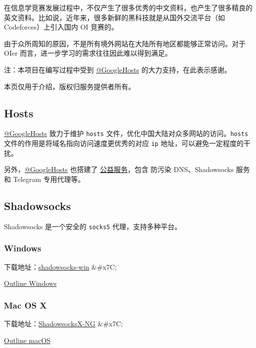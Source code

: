 
在信息学竞赛发展过程中，不仅产生了很多优秀的中文资料，也产生了很多精良的英文资料。比如说，近年来，很多新鲜的黑科技就是从国外交流平台（如 Codeforces）上引入国内 OI 竞赛的。

由于众所周知的原因，不是所有境外网站在大陆所有地区都能够正常访问。对于 OIer 而言，进一步学习的需求往往因此难以得到满足。

注：本项目在编写过程中受到 \href{https://github.com/GoogleHosts/hosts}{@GoogleHosts} 的大力支持，在此表示感谢。

本页仅用于介绍，版权归服务提供者所有。

\subsection{Hosts}

\href{https://github.com/GoogleHosts/hosts}{@GoogleHosts} 致力于维护 \texttt{hosts} 文件，优化中国大陆对众多网站的访问。\texttt{hosts} 文件的作用是将域名指向访问速度更优秀的对应 \texttt{ip} 地址，可以避免一定程度的干扰。

另外，\href{https://github.com/GoogleHosts/hosts}{@GoogleHosts} 也搭建了 \href{https://github.com/googlehosts/hosts/wiki/%E5%AE%9E%E9%AA%8C%E5%AE%A4}{公益服务}，包含 防污染 DNS、Shadowsocks 服务和 Telegram 专用代理等。

\subsection{Shadowsocks}

Shadowsocks 是一个安全的 \texttt{socks5} 代理，支持多种平台。

\subsubsection{Windows}

下载地址：\href{https://github.com/shadowsocks/shadowsocks-windows/releases}{shadowsocks-win} \&\#x7C;

\href{https://raw.githubusercontent.com/Jigsaw-Code/outline-releases/master/client/Outline-Client.exe}{Outline Windows}

\subsubsection{Mac OS X}

下载地址：\href{https://github.com/shadowsocks/ShadowsocksX-NG/releases}{ShadowsocksX-NG} \&\#x7C;

\href{https://itunes.apple.com/app/outline-app/id1356178125}{Outline macOS}

